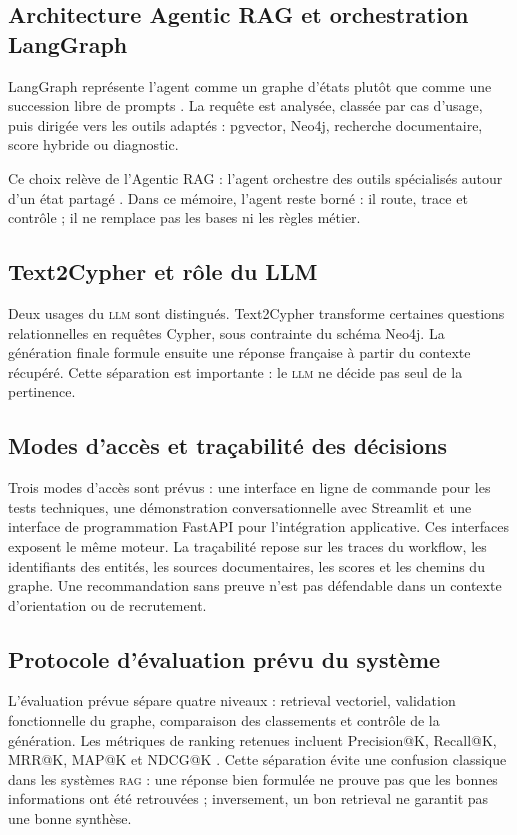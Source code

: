 \documentclass[12pt,twoside]{report}
\newcommand{\RAG}{\textsc{rag}}
\newcommand{\LLM}{\textsc{llm}}
\begin{document}
\subsection{Architecture Agentic RAG et orchestration LangGraph}

LangGraph représente l'agent comme un graphe d'états plutôt que comme une succession libre de prompts \cite{langgraphdocs2026}. La requête est analysée, classée par cas d'usage, puis dirigée vers les outils adaptés : pgvector, Neo4j, recherche documentaire, score hybride ou diagnostic.

Ce choix relève de l'Agentic RAG : l'agent orchestre des outils spécialisés autour d'un état partagé \cite{yao2023react,asai2024selfrag}. Dans ce mémoire, l'agent reste borné : il route, trace et contrôle ; il ne remplace pas les bases ni les règles métier.

\subsection{Text2Cypher et rôle du LLM}

Deux usages du \LLM{} sont distingués. Text2Cypher transforme certaines questions relationnelles en requêtes Cypher, sous contrainte du schéma Neo4j. La génération finale formule ensuite une réponse française à partir du contexte récupéré. Cette séparation est importante : le \LLM{} ne décide pas seul de la pertinence. %

\subsection{Modes d'accès et traçabilité des décisions}
Trois modes d'accès sont prévus : une interface en ligne de commande pour les tests techniques, une démonstration conversationnelle avec Streamlit et une interface de programmation FastAPI pour l'intégration applicative. Ces interfaces exposent le même moteur. La traçabilité repose sur les traces du workflow, les identifiants des entités, les sources documentaires, les scores et les chemins du graphe. Une recommandation sans preuve n'est pas défendable dans un contexte d'orientation ou de recrutement.
\subsection{Protocole d'évaluation prévu du système}
L'évaluation prévue sépare quatre niveaux : retrieval vectoriel, validation fonctionnelle du graphe, comparaison des classements et contrôle de la génération. Les métriques de ranking retenues incluent Precision@K, Recall@K, MRR@K, MAP@K et NDCG@K \cite{thakur2021beir,muennighoff2022mteb}. Cette séparation évite une confusion classique dans les systèmes \RAG{} : une réponse bien formulée ne prouve pas que les bonnes informations ont été retrouvées ; inversement, un bon retrieval ne garantit pas une bonne synthèse.
\end{document}
